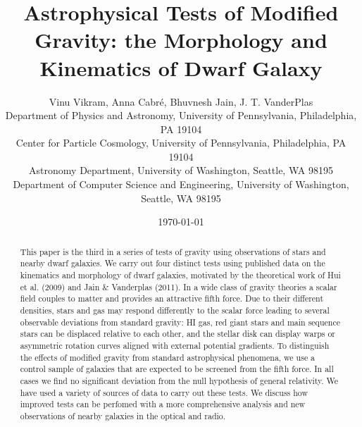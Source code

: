 \documentclass[useAMS,usenatbib,twocolumn]{mn2e}
\begin{document}
\title[Astrophysical Tests of Modified Gravity]{Astrophysical Tests
of Modified Gravity: the Morphology and Kinematics of Dwarf Galaxy} 
\author[Vikram, V. {\it et al.}]{Vinu Vikram, Anna Cabr\'e, Bhuvnesh Jain, J.
T. VanderPlas\\
  Department of Physics and Astronomy, University of Pennsylvania, 
  Philadelphia, PA 19104\\
  Center for Particle Cosmology, University of Pennsylvania, 
  Philadelphia, PA 19104\\
  Astronomy Department, University of Washington,
  Seattle, WA 98195\\
  Department of Computer Science and Engineering, University of Washington,
  Seattle, WA 98195
}

\date{\today}
\maketitle


\begin{abstract}
This paper is the third in a series of tests of gravity using observations of 
stars and nearby
dwarf galaxies. We carry out four distinct tests using published data on the
kinematics
and morphology of dwarf galaxies, motivated by the theoretical work of
Hui et al. (2009) and Jain \& Vanderplas (2011). In a wide class of
gravity theories a scalar field couples to matter and provides an attractive
fifth force. Due to their different densities,
stars and gas may respond differently to the scalar force leading
to several observable deviations from standard gravity: 
HI gas, red giant stars and main sequence stars
can be displaced relative to each other,
and the stellar disk can display warps or asymmetric rotation curves
aligned with external potential gradients.  
To distinguish the effects of modified
gravity from standard astrophysical phenomena, we use a control sample of
galaxies that are expected to be screened from the fifth force.
In all cases we find no significant deviation
from the null hypothesis of general relativity. We have used a variety of
sources of data to carry out these tests. We discuss how 
improved tests can be perfomed with a more comprehensive analysis and
new observations of nearby galaxies in the optical and radio.
\nocite{hui09, bhuvjake2011}
\end{abstract}
\end{document}
